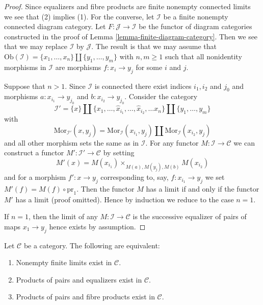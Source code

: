 \begin{proof}
Since equalizers and fibre products are finite nonempty connected
limits we see that (2) implies (1). For the converse, let $\mathcal{I}$
be a finite nonempty connected diagram category. Let
$F : \mathcal{J} \to \mathcal{I}$
be the functor of diagram categories constructed in the proof of
Lemma \ref{lemma-finite-diagram-category}.
Then we see that we may replace $\mathcal{I}$ by $\mathcal{J}$.
The result is that we may assume that
$\text{Ob}(\mathcal{I}) = \{x_1, \ldots, x_n\} \amalg \{y_1, \ldots, y_m\}$
with $n, m \geq 1$ such that all nonidentity morphisms in $\mathcal{I}$
are morphisms $f : x_i \to y_j$ for some $i$ and $j$.

\medskip\noindent
Suppose that $n > 1$. Since $\mathcal{I}$ is connected there
exist indices $i_1, i_2$ and $j_0$ and morphisms $a : x_{i_1} \to y_{j_0}$
and $b : x_{i_2} \to y_{j_0}$. Consider the category
$$
\mathcal{I}' =
\{x\} \amalg \{x_1, \ldots, \hat x_{i_1}, \ldots, \hat x_{i_2}, \ldots x_n\}
\amalg \{y_1, \ldots, y_m\}
$$
with
$$
\text{Mor}_{\mathcal{I}'}(x, y_j) = \text{Mor}_{\mathcal{I}}(x_{i_1}, y_j)
\amalg \text{Mor}_{\mathcal{I}}(x_{i_2}, y_j)
$$
and all other morphism sets the same as in $\mathcal{I}$. For any functor
$M : \mathcal{I} \to \mathcal{C}$ we can construct a functor
$M' : \mathcal{I}' \to \mathcal{C}$ by setting
$$
M'(x) = M(x_{i_1}) \times_{M(a), M(y_j), M(b)} M(x_{i_2})
$$
and for a morphism $f' : x \to y_j$ corresponding to, say,
$f : x_{i_1} \to y_j$ we set $M'(f) = M(f) \circ \text{pr}_1$.
Then the functor $M$ has a limit if and only if the functor $M'$ has
a limit (proof omitted). Hence by induction we reduce to the case $n = 1$.

\medskip\noindent
If $n = 1$, then the limit of any $M : \mathcal{I} \to \mathcal{C}$ is
the successive equalizer of pairs of maps $x_1 \to y_j$ hence
exists by assumption.
\end{proof}

\begin{lemma}
\label{lemma-almost-finite-limits-exist}
Let $\mathcal{C}$ be a category.
The following are equivalent:
\begin{enumerate}
\item Nonempty finite limits exist in $\mathcal{C}$.
\item Products of pairs and equalizers exist in $\mathcal{C}$.
\item Products of pairs and fibre products exist in $\mathcal{C}$.
\end{enumerate}
\end{lemma}

